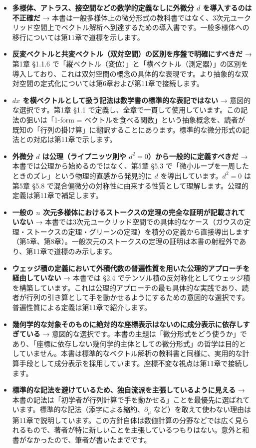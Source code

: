 \documentclass[a4paper,12pt,openany]{book}
\begin{document}
\begin{itemize}
\item
  \textbf{多様体、アトラス、接空間などの数学的定義なしに外微分 $d$ を導入するのは不正確だ}
  →
  本書は一般多様体上の微分形式の教科書ではなく、3次元ユークリッド空間上でベクトル解析へ到達するための導入書です。一般多様体への移行については第11章で道標を示します。
\item
  \textbf{反変ベクトルと共変ベクトル（双対空間）の区別を序盤で明確にすべきだ}
  → 第1章 §1.1.6
  で「縦ベクトル（変位）」と「横ベクトル（測定器）」の区別を導入しており、これは双対空間の概念の具体的な表現です。より抽象的な双対空間の定式化については第6章および第11章で接続します。
\item
  \textbf{$dx$ を横ベクトルとして扱う記法は数学書の標準的な表記ではない}
  → 意図的な選択です。第1章 §1.1
  で定義し、全章で一貫して使用しています。この記法の狙いは「1-form =
  ベクトルを食べる関数」という抽象概念を、読者が既知の「行列の掛け算」に翻訳することにあります。標準的な微分形式の記法との対応は第11章で示します。
\item
  \textbf{外微分 $d$ は公理（ライプニッツ則や $d^2=0$）から一般的に定義すべきだ}
  → 本書では公理から始めるのではなく、第5章 §5.3
  で「微小ループを一周したときのズレ」という物理的直感から発見的に \(d\)
  を導出しています。\(d^2=0\) は第5章 §5.8
  で混合偏微分の対称性に由来する性質として理解します。公理的定義は第11章で補足します。
\item
  \textbf{一般の $n$ 次元多様体におけるストークスの定理の完全な証明が記載されていない}
  →
  本書では3次元ユークリッド空間での具体的なケース（ガウスの定理・ストークスの定理・グリーンの定理）を積分の定義から直接導出します（第5章、第8章）。一般次元のストークスの定理の証明は本書の射程外であり、第11章で道標のみ示します。
\item
  \textbf{ウェッジ積の定義において外積代数の普遍性質を用いた公理的アプローチを経由していない}
  → 本書では §2.4
  でテンソル積の反対称化としてウェッジ積を構築しています。これは公理的アプローチの最も具体的な実践であり、読者が行列の引き算として手を動かせるようにするための意図的な選択です。普遍性質による定義は第11章で紹介します。
\item
  \textbf{幾何学的な対象そのものに絶対的な座標表示はないのに成分表示に依存しすぎている}
  →
  意図的な選択です。本書の主題は「微分形式をどう使うか」であり、「座標に依存しない幾何学的主体としての微分形式」の哲学は目的としていません。本書は標準的なベクトル解析の教科書と同様に、実用的な計算手段として成分表示を採用しています。座標不変な視点は第11章で接続します。
\item
  \textbf{標準的な記法を避けているため、独自流派を主張しているように見える}
  →
  本書の記法は「初学者が行列計算で手を動かせる」ことを最優先に選ばれています。標準的な記法（添字による縮約、\(\partial_\mu\)
  など）を敢えて使わない理由は第11章で説明しています。この方針自体は数値計算の分野などでは広く見られるもので、著者が特に新しいことを主張しているつもりはない。意外と和書がなかったので、筆者が書いたまでです。
\end{itemize}
\end{document}
